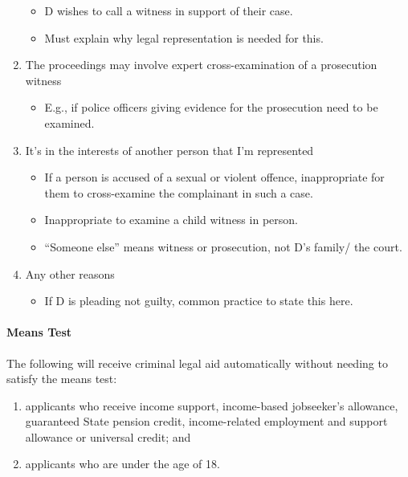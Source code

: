 \documentclass[
]{article}
\providecommand{\tightlist}{%
  \setlength{\itemsep}{0pt}\setlength{\parskip}{0pt}}
\begin{document}
\begin{enumerate}
  \begin{itemize}
  \tightlist
  \item
    D wishes to call a witness in support of their case.
  \item
    Must explain why legal representation is needed for this.
  \end{itemize}
\item
  The proceedings may involve expert cross-examination of a prosecution
  witness

  \begin{itemize}
  \tightlist
  \item
    E.g., if police officers giving evidence for the prosecution need to
    be examined.
  \end{itemize}
\item
  It's in the interests of another person that I'm represented

  \begin{itemize}
  \tightlist
  \item
    If a person is accused of a sexual or violent offence, inappropriate
    for them to cross-examine the complainant in such a case.
  \item
    Inappropriate to examine a child witness in person.
  \item
    ``Someone else'' means witness or prosecution, not D's family/ the
    court.
  \end{itemize}
\item
  Any other reasons

  \begin{itemize}
  \tightlist
  \item
    If D is pleading not guilty, common practice to state this here.
  \end{itemize}
\end{enumerate}

\hypertarget{means-test}{%
\paragraph{Means Test}\label{means-test}}

The following will receive criminal legal aid automatically without
needing to satisfy the means test:

\begin{enumerate}
\def\labelenumi{\arabic{enumi}.}
\tightlist
\item
  applicants who receive income support, income-based jobseeker's
  allowance, guaranteed State pension credit, income-related employment
  and support allowance or universal credit; and
\item
  applicants who are under the age of 18.
\end{enumerate}
\end{document}
